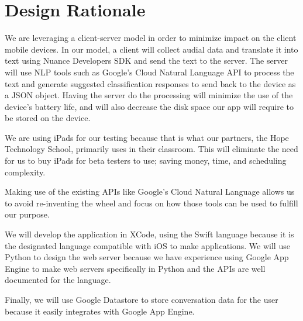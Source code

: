 \chapter{Design Rationale}

We are leveraging a client-server model in order to minimize impact on the client mobile devices. In our model, a client will collect audial data and translate it into text using Nuance Developers SDK and send the text to the server. The server will use NLP tools such as Google's Cloud Natural Language API to process the text and generate suggested classification responses to send back to the device as a JSON object. Having the server do the processing will minimize the use of the device's battery life, and will also decrease the disk space our app will require to be stored on the device. 

We are using iPads for our testing because that is what our partners, the Hope Technology School, primarily uses in their classroom. This will eliminate the need for us to buy iPads for beta testers to use; saving money, time, and scheduling complexity.

Making use of the existing APIs like Google's Cloud Natural Language allows us to avoid re-inventing the wheel and focus on how those tools can be used to fulfill our purpose. 

We will develop the application in XCode, using the Swift language because it is the designated language compatible with iOS to make applications. We will use Python to design the web server because we have experience using Google App Engine to make web servers specifically in Python and the APIs are well documented for the language.

Finally, we will use Google Datastore to store conversation data for the user because it easily integrates with Google App Engine.
